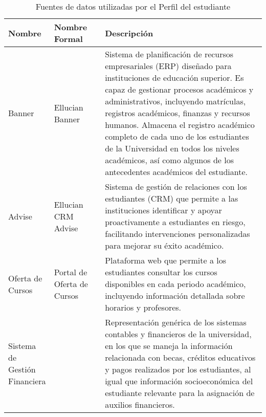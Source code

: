 \begin{table}[h]
	\caption{Fuentes de datos utilizadas por el Perfil del estudiante}
	\centering
	\alternatecolors
	\begin{tabular}{p{0.15\linewidth}p{0.2\linewidth}p{0.65\linewidth}}
		\hline
		\textbf{Nombre}               & \textbf{Nombre Formal}     & \textbf{Descripción}                                                                                                                                                                                                                                                                                                                                                                                                                                       \\
		\hline
		Banner                        & Ellucian Banner            & Sistema de planificación de recursos empresariales (ERP) diseñado para instituciones de educación superior. Es capaz de gestionar procesos académicos y administrativos, incluyendo matrículas, registros académicos, finanzas y recursos humanos. \cite{banner} Almacena el registro académico completo de cada uno de los estudiantes de la Universidad en todos los niveles académicos, así como algunos de los antecedentes académicos del estudiante. \\
		Advise                        & Ellucian CRM Advise        & Sistema de gestión de relaciones con los estudiantes (CRM) que permite a las instituciones identificar y apoyar proactivamente a estudiantes en riesgo, facilitando intervenciones personalizadas para mejorar su éxito académico. \cite{advise}                                                                                                                                                                                                           \\
		Oferta de Cursos              & Portal de Oferta de Cursos & Plataforma web que permite a los estudiantes consultar los cursos disponibles en cada periodo académico, incluyendo información detallada sobre horarios y profesores. \cite{oferta_cursos}                                                                                                                                                                                                                                                                \\
		Sistema de Gestión Financiera &                            & Representación genérica de los sistemas contables y financieros de la universidad, en los que se maneja la información relacionada con becas, créditos educativos y pagos realizados por los estudiantes, al igual que información socioeconómica del estudiante relevante para la asignación de auxilios financieros.                                                                                                                                      \\
		\hline
	\end{tabular}
	\label{tab:fuentes_datos}
\end{table}

